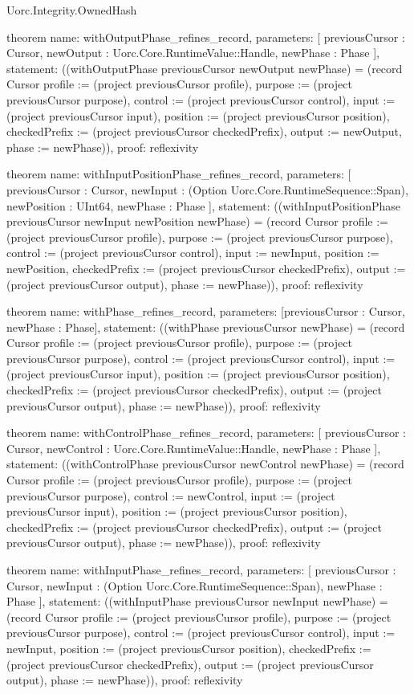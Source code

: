 \begin{lexlean}{Uorc.Integrity.OwnedHash}
\begin{semanticmodule}
theorem{
  name: withOutputPhase_refines_record,
  parameters: [
    previousCursor : Cursor,
    newOutput : Uorc.Core.RuntimeValue::Handle,
    newPhase : Phase
  ],
  statement: ((withOutputPhase previousCursor newOutput newPhase) = (record Cursor {profile := (project previousCursor profile), purpose := (project previousCursor purpose), control := (project previousCursor control), input := (project previousCursor input), position := (project previousCursor position), checkedPrefix := (project previousCursor checkedPrefix), output := newOutput, phase := newPhase})),
  proof: reflexivity{}
}

theorem{
  name: withInputPositionPhase_refines_record,
  parameters: [
    previousCursor : Cursor,
    newInput : (Option Uorc.Core.RuntimeSequence::Span),
    newPosition : UInt64,
    newPhase : Phase
  ],
  statement: ((withInputPositionPhase previousCursor newInput newPosition newPhase) = (record Cursor {profile := (project previousCursor profile), purpose := (project previousCursor purpose), control := (project previousCursor control), input := newInput, position := newPosition, checkedPrefix := (project previousCursor checkedPrefix), output := (project previousCursor output), phase := newPhase})),
  proof: reflexivity{}
}

theorem{
  name: withPhase_refines_record,
  parameters: [previousCursor : Cursor, newPhase : Phase],
  statement: ((withPhase previousCursor newPhase) = (record Cursor {profile := (project previousCursor profile), purpose := (project previousCursor purpose), control := (project previousCursor control), input := (project previousCursor input), position := (project previousCursor position), checkedPrefix := (project previousCursor checkedPrefix), output := (project previousCursor output), phase := newPhase})),
  proof: reflexivity{}
}

theorem{
  name: withControlPhase_refines_record,
  parameters: [
    previousCursor : Cursor,
    newControl : Uorc.Core.RuntimeValue::Handle,
    newPhase : Phase
  ],
  statement: ((withControlPhase previousCursor newControl newPhase) = (record Cursor {profile := (project previousCursor profile), purpose := (project previousCursor purpose), control := newControl, input := (project previousCursor input), position := (project previousCursor position), checkedPrefix := (project previousCursor checkedPrefix), output := (project previousCursor output), phase := newPhase})),
  proof: reflexivity{}
}

theorem{
  name: withInputPhase_refines_record,
  parameters: [
    previousCursor : Cursor,
    newInput : (Option Uorc.Core.RuntimeSequence::Span),
    newPhase : Phase
  ],
  statement: ((withInputPhase previousCursor newInput newPhase) = (record Cursor {profile := (project previousCursor profile), purpose := (project previousCursor purpose), control := (project previousCursor control), input := newInput, position := (project previousCursor position), checkedPrefix := (project previousCursor checkedPrefix), output := (project previousCursor output), phase := newPhase})),
  proof: reflexivity{}
}


\end{semanticmodule}
\end{lexlean}
